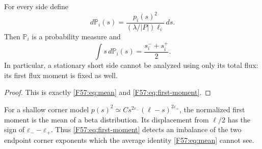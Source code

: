 \begin{corollary}\label{F57:cor:probability}
For every side define
\begin{equation}\label{F57:eq:probability}
 d\mathbb P_i(s)=
 \frac{p_i(s)^2}{(\lambda/|P|)\ell_i}\,ds.
\end{equation}
Then $\mathbb P_i$ is a probability measure and
\begin{equation}
 \int s\,d\mathbb P_i(s)=\frac{s_i^-+s_i^+}{2}.
\end{equation}
In particular, a stationary short side cannot be analyzed using only its
total flux: its first flux moment is fixed as well.
\end{corollary}

\begin{proof}
This is exactly \eqref{F57:eq:mean} and \eqref{F57:eq:first-moment}.
\end{proof}

\begin{remark}
For a shallow corner model
$p(s)^2\simeq C s^{2\varepsilon_-}
(\ell-s)^{2\varepsilon_+}$, the normalized first moment is the mean of a
beta distribution.  Its displacement from $\ell/2$ has the sign of
$\varepsilon_--\varepsilon_+$.  Thus \eqref{F57:eq:first-moment} detects an
imbalance of the two endpoint corner exponents which the average identity
\eqref{F57:eq:mean} cannot see.
\end{remark}
\endgroup
